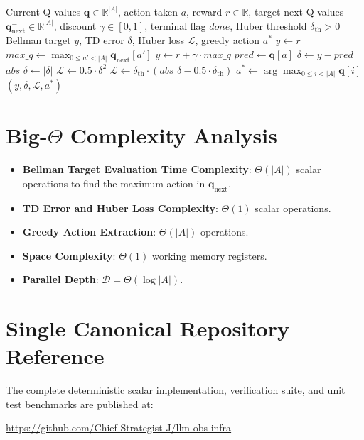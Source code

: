 \documentclass[11pt,a4paper]{article}
\theoremstyle{definition}
\begin{document}
\begin{algorithm}[H]
\caption{Deep Q-Network (DQN) 1-Step Bellman Step and Huber Loss Evaluation}
\begin{algorithmic}[1]
\Require Current Q-values $\mathbf{q} \in \mathbb{R}^{|A|}$, action taken $a$, reward $r \in \mathbb{R}$, target next Q-values $\mathbf{q}_{\text{next}}^- \in \mathbb{R}^{|A|}$, discount $\gamma \in [0, 1]$, terminal flag $done$, Huber threshold $\delta_{\text{th}} > 0$
\Ensure Bellman target $y$, TD error $\delta$, Huber loss $\mathcal{L}$, greedy action $a^*$
 
    \State $y \gets r$
\Else
    \State $max\_q \gets \max_{0 \le a' < |A|} \mathbf{q}_{\text{next}}^-[a']$
    \State $y \gets r + \gamma \cdot max\_q$
\EndIf
\State $pred \gets \mathbf{q}[a]$
\State $\delta \gets y - pred$ 
\State $abs\_\delta \gets |\delta|$ 
    \State $\mathcal{L} \gets 0.5 \cdot \delta^2$
\Else
    \State $\mathcal{L} \gets \delta_{\text{th}} \cdot (abs\_\delta - 0.5 \cdot \delta_{\text{th}})$
\EndIf
\State $a^* \gets \arg\max_{0 \le i < |A|} \mathbf{q}[i]$ 
\State \Return $(y, \delta, \mathcal{L}, a^*)$
\end{algorithmic}
\end{algorithm}

\section{Big-$\Theta$ Complexity Analysis}

\begin{itemize}
    \item \textbf{Bellman Target Evaluation Time Complexity}: $\Theta(|A|)$ scalar operations to find the maximum action in $\mathbf{q}_{\text{next}}^-$.
    \item \textbf{TD Error and Huber Loss Complexity}: $\Theta(1)$ scalar operations.
    \item \textbf{Greedy Action Extraction}: $\Theta(|A|)$ operations.
    \item \textbf{Space Complexity}: $\Theta(1)$ working memory registers.
    \item \textbf{Parallel Depth}: $\mathcal{D} = \Theta(\log |A|)$.
\end{itemize}

\section{Single Canonical Repository Reference}

The complete deterministic scalar implementation, verification suite, and unit test benchmarks are published at:
\begin{center}
\url{https://github.com/Chief-Strategist-J/llm-obs-infra}
\end{center}
\end{document}
